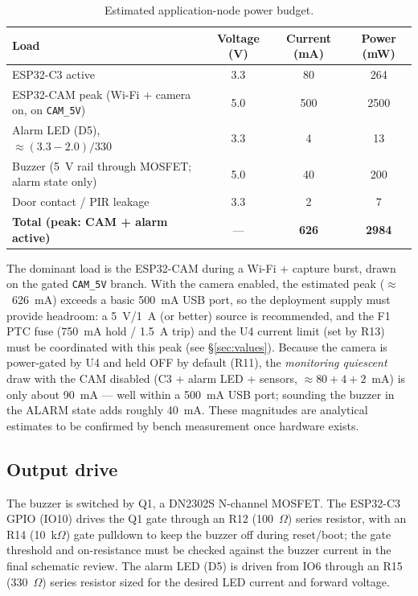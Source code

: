 \documentclass[11pt,a4paper]{article}
\begin{document}
\begin{table}[H]
    \centering
    \caption{Estimated application-node power budget.}
    \label{tab:power}
    \begin{tabular}{@{}>{\raggedright\arraybackslash}p{6.4cm}ccc@{}}
        \toprule
        \textbf{Load} & \textbf{Voltage (V)} & \textbf{Current (mA)} & \textbf{Power (mW)} \\
        \midrule
        ESP32-C3 active & 3.3 & 80 & 264 \\
        ESP32-CAM peak (Wi-Fi + camera on, on \texttt{CAM\_5V}) & 5.0 & 500 & 2500 \\
        Alarm LED (D5), $\approx(3.3-2.0)/330$ & 3.3 & 4 & 13 \\
        Buzzer (5~V rail through MOSFET; alarm state only) & 5.0 & 40 & 200 \\
        Door contact / PIR leakage & 3.3 & 2 & 7 \\
        \midrule
        \textbf{Total (peak: CAM + alarm active)} & --- & \textbf{626} & \textbf{2984} \\
        \bottomrule
    \end{tabular}
\end{table}

The dominant load is the ESP32-CAM during a Wi-Fi + capture burst, drawn on the
gated \texttt{CAM\_5V} branch.  With the camera enabled, the estimated peak
($\approx$~626~mA) exceeds a basic 500~mA USB port, so the deployment supply
must provide headroom: a 5~V/1~A (or better) source is recommended, and the F1
PTC fuse (750~mA hold / 1.5~A trip) and the U4 current limit (set by R13) must be
coordinated with this peak (see \S\ref{sec:values}).  Because the camera is
power-gated by U4 and held OFF by default (R11), the \emph{monitoring quiescent}
draw with the CAM disabled (C3 + alarm LED + sensors, $\approx 80+4+2$~mA) is
only about 90~mA --- well within a 500~mA USB port; sounding the buzzer in the
ALARM state adds roughly 40~mA.  These magnitudes are analytical estimates to be
confirmed by bench measurement once hardware exists.

\subsection{Output drive}

The buzzer is switched by Q1, a DN2302S N-channel MOSFET.  The ESP32-C3 GPIO
(IO10) drives the Q1 gate through an R12 (100~$\Omega$) series resistor, with an
R14 (10~k$\Omega$) gate pulldown to keep the buzzer off during reset/boot; the
gate threshold and on-resistance must be checked against the buzzer current in
the final schematic review.  The alarm LED (D5) is driven from IO6 through an
R15 (330~$\Omega$) series resistor sized for the desired LED current and forward
voltage.
\end{document}
